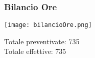 \begin{frame}
  \frametitle{Bilancio Ore}
  \texttt{[image: bilancioOre.png]}

	Totale preventivate: 735 \\
	Totale effettive: 735
\end{frame}
